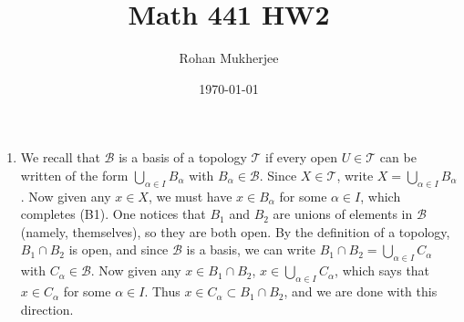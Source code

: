 \documentclass[12pt]{article}
\title{Math 441 HW2}
\date{\today}
\author{Rohan Mukherjee}
\theoremstyle{definitionstyle}
\begin{document}
	\maketitle
	\begin{enumerate}[leftmargin=\labelsep]
		\item We recall that $\mathcal{B}$ is a basis of a topology $\mathcal{T}$ if every open $U \in \mathcal{T}$ can be written of the form $\bigcup_{\alpha \in I} B_\alpha$ with $B_\alpha \in \mathcal{B}$. Since $X \in \mathcal{T}$, write $X = \bigcup_{\alpha \in I} B_\alpha$. Now given any $x \in X$, we must have $x \in B_\alpha$ for some $\alpha \in I$, which completes (B1). One notices that $B_1$ and $B_2$ are unions of elements in $\mathcal{B}$ (namely, themselves), so they are both open. By the definition of a topology, $B_1 \cap B_2$ is open, and since $\mathcal{B}$ is a basis, we can write $B_1 \cap B_2 = \bigcup_{\alpha \in I} C_\alpha$ with $C_\alpha \in \mathcal B$. Now given any $x \in B_1 \cap B_2$, $x \in \bigcup_{\alpha \in I} C_\alpha$, which says that $x \in C_\alpha$ for some $\alpha \in I$. Thus $x \in C_\alpha \subset B_1 \cap B_2$, and we are done with this direction. 
		

\end{enumerate}
\end{document}
